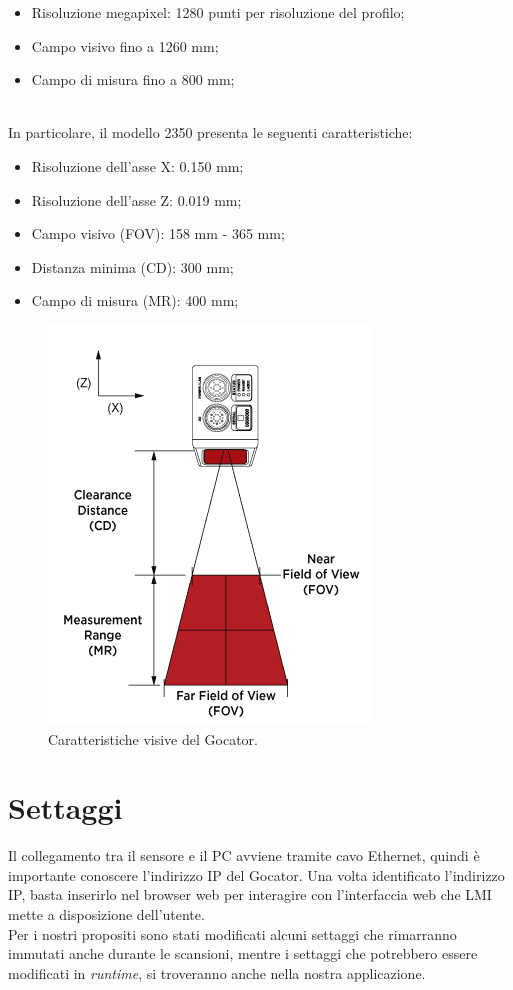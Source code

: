 \begin{itemize}
	\item Risoluzione megapixel: 1280 punti per risoluzione del profilo;
	\item Campo visivo fino a 1260 mm;
	\item Campo di misura fino a 800 mm;
\end{itemize}

\ \\
\noindent In particolare, il modello 2350 presenta le seguenti caratteristiche: 

\begin{itemize}
	\item Risoluzione dell'asse X: 0.150 mm;
	\item Risoluzione dell'asse Z: 0.019 mm;
	\item Campo visivo (FOV): 158 mm - 365 mm;
	\item Distanza minima (CD): 300 mm;
	\item Campo di misura (MR): 400 mm;
\end{itemize}

\begin{figure}[H]
	\centering
	\includegraphics[scale=0.60]{./pictures/gocator_2.png}
	\caption{Caratteristiche visive del Gocator.}\label{fig:gocator_2}
\end{figure}

\section{Settaggi}
Il collegamento tra il sensore e il PC avviene tramite cavo Ethernet, quindi è importante conoscere l'indirizzo IP del Gocator. Una volta identificato l'indirizzo IP, basta inserirlo nel browser web per interagire con l'interfaccia web che LMI mette a disposizione dell'utente.\\
\newline
Per i nostri propositi sono stati modificati alcuni settaggi che rimarranno immutati anche durante le scansioni, mentre i settaggi che potrebbero essere modificati in \textit{runtime}, si troveranno anche nella nostra applicazione.

